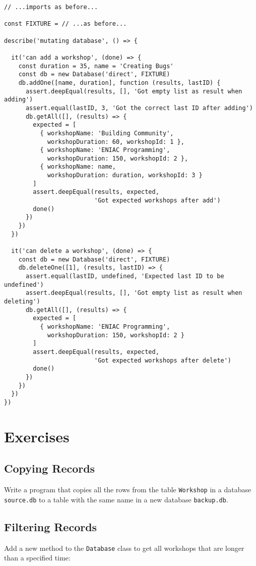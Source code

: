 \begin{verbatim}
// ...imports as before...

const FIXTURE = // ...as before...

describe('mutating database', () => {

  it('can add a workshop', (done) => {
    const duration = 35, name = 'Creating Bugs'
    const db = new Database('direct', FIXTURE)
    db.addOne([name, duration], function (results, lastID) {
      assert.deepEqual(results, [], 'Got empty list as result when adding')
      assert.equal(lastID, 3, 'Got the correct last ID after adding')
      db.getAll([], (results) => {
        expected = [
          { workshopName: 'Building Community',
            workshopDuration: 60, workshopId: 1 },
          { workshopName: 'ENIAC Programming',
            workshopDuration: 150, workshopId: 2 },
          { workshopName: name,
            workshopDuration: duration, workshopId: 3 }
        ]
        assert.deepEqual(results, expected,
                         'Got expected workshops after add')
        done()
      })
    })
  })

  it('can delete a workshop', (done) => {
    const db = new Database('direct', FIXTURE)
    db.deleteOne([1], (results, lastID) => {
      assert.equal(lastID, undefined, 'Expected last ID to be undefined')
      assert.deepEqual(results, [], 'Got empty list as result when deleting')
      db.getAll([], (results) => {
        expected = [
          { workshopName: 'ENIAC Programming',
            workshopDuration: 150, workshopId: 2 }
        ]
        assert.deepEqual(results, expected,
                         'Got expected workshops after delete')
        done()
      })
    })
  })
})
\end{verbatim}

\section{Exercises}\label{s:db-exercises}

\subsection*{Copying Records}
Write a program that copies all the rows
from the table \texttt{Workshop} in a database \texttt{source.db}
to a table with the same name in a new database \texttt{backup.db}.

\subsection*{Filtering Records}
Add a new method to the \texttt{Database} class
to get all workshops that are longer than a specified time:

